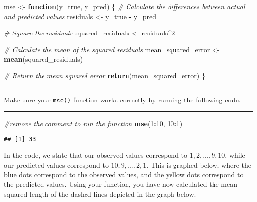 \documentclass[
  12pt,
]{article}
\newenvironment{Shaded}{\begin{snugshade}}{\end{snugshade}}
\newcommand{\CommentTok}[1]{\textcolor[rgb]{0.56,0.35,0.01}{\textit{#1}}}
\newcommand{\ControlFlowTok}[1]{\textcolor[rgb]{0.13,0.29,0.53}{\textbf{#1}}}
\newcommand{\DecValTok}[1]{\textcolor[rgb]{0.00,0.00,0.81}{#1}}
\newcommand{\FunctionTok}[1]{\textcolor[rgb]{0.13,0.29,0.53}{\textbf{#1}}}
\newcommand{\NormalTok}[1]{#1}
\newcommand{\OtherTok}[1]{\textcolor[rgb]{0.56,0.35,0.01}{#1}}
\newcommand{\SpecialCharTok}[1]{\textcolor[rgb]{0.81,0.36,0.00}{\textbf{#1}}}
\begin{document}
\begin{Shaded}
\begin{Highlighting}[]
\NormalTok{mse }\OtherTok{\textless{}{-}} \ControlFlowTok{function}\NormalTok{(y\_true, y\_pred) \{}
  \CommentTok{\# Calculate the differences between actual and predicted values}
\NormalTok{  residuals }\OtherTok{\textless{}{-}}\NormalTok{ y\_true }\SpecialCharTok{{-}}\NormalTok{ y\_pred}
  
  \CommentTok{\# Square the residuals}
\NormalTok{  squared\_residuals }\OtherTok{\textless{}{-}}\NormalTok{ residuals}\SpecialCharTok{\^{}}\DecValTok{2}
  
  \CommentTok{\# Calculate the mean of the squared residuals}
\NormalTok{  mean\_squared\_error }\OtherTok{\textless{}{-}} \FunctionTok{mean}\NormalTok{(squared\_residuals)}
  
  \CommentTok{\# Return the mean squared error}
  \FunctionTok{return}\NormalTok{(mean\_squared\_error)}
\NormalTok{\}}
\end{Highlighting}
\end{Shaded}

\begin{center}\rule{0.5\linewidth}{0.5pt}\end{center}

Make sure your \texttt{mse()} function works correctly by running the
following code.\_\_

\begin{center}\rule{0.5\linewidth}{0.5pt}\end{center}

\begin{Shaded}
\begin{Highlighting}[]
\CommentTok{\#remove the comment to run the function}
\FunctionTok{mse}\NormalTok{(}\DecValTok{1}\SpecialCharTok{:}\DecValTok{10}\NormalTok{, }\DecValTok{10}\SpecialCharTok{:}\DecValTok{1}\NormalTok{)}
\end{Highlighting}
\end{Shaded}

\begin{verbatim}
## [1] 33
\end{verbatim}

In the code, we state that our observed values correspond to
\(1, 2, ..., 9, 10\), while our predicted values correspond to
\(10, 9, ..., 2, 1\). This is graphed below, where the blue dots
correspond to the observed values, and the yellow dots correspond to the
predicted values. Using your function, you have now calculated the mean
squared length of the dashed lines depicted in the graph below.
\end{document}
